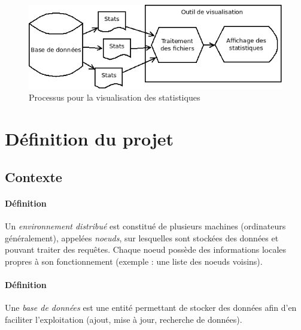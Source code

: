 \documentclass[12pt]{article}
\begin{document}
\begin{figure}[h]
	\centering
		\includegraphics[width=12cm]{visu.png}
	\caption{Processus pour la visualisation des statistiques \label{fig:visu}}
\end{figure}




\section{Définition du projet}

\subsection{Contexte}

\paragraph{Définition} Un \textit{environnement distribué} est constitué de plusieurs machines (ordinateurs généralement), appelées \textit{noeuds}, sur lesquelles sont stockées des données et pouvant traiter des requêtes. Chaque noeud possède des informations locales propres à son fonctionnement (exemple : une liste des noeuds voisins).

\paragraph{Définition} Une \textit{base de données} est une entité permettant de stocker des données afin d'en faciliter l'exploitation (ajout, mise à jour, recherche de données).

\end{document}
